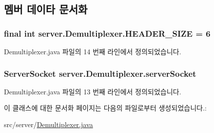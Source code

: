\subsection{멤버 데이타 문서화}
\hypertarget{classserver_1_1_demultiplexer_aea070faa805aef528fe606091b2d25b2}{
\subsubsection[{H\-E\-A\-D\-E\-R\-\_\-\-S\-I\-Z\-E}]{\setlength{\rightskip}{0pt plus 5cm}final int server.\-Demultiplexer.\-H\-E\-A\-D\-E\-R\-\_\-\-S\-I\-Z\-E = 6\hspace{0.3cm}{\ttfamily [private]}}}\label{classserver_1_1_demultiplexer_aea070faa805aef528fe606091b2d25b2}


Demultiplexer.\-java 파일의 14 번째 라인에서 정의되었습니다.

\hypertarget{classserver_1_1_demultiplexer_a45a45c637b717c6d3114e8f3ade5b477}{
\subsubsection[{server\-Socket}]{\setlength{\rightskip}{0pt plus 5cm}Server\-Socket server.\-Demultiplexer.\-server\-Socket\hspace{0.3cm}{\ttfamily [private]}}}\label{classserver_1_1_demultiplexer_a45a45c637b717c6d3114e8f3ade5b477}


Demultiplexer.\-java 파일의 13 번째 라인에서 정의되었습니다.



이 클래스에 대한 문서화 페이지는 다음의 파일로부터 생성되었습니다.\-:\begin{DoxyCompactItemize}
\item 
src/server/\hyperlink{_demultiplexer_8java}{Demultiplexer.\-java}\end{DoxyCompactItemize}
